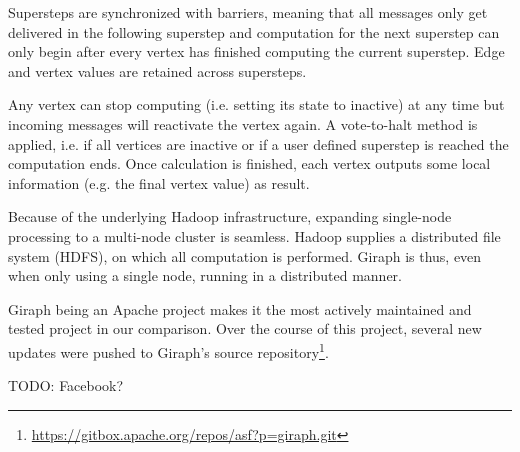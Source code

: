 Supersteps are synchronized with barriers, meaning that all messages only get delivered in the following superstep and computation for the next superstep can only begin after every vertex has finished computing the current superstep.
Edge and vertex values are retained across supersteps.

Any vertex can stop computing (i.e. setting its state to inactive) at any time but incoming messages will reactivate the vertex again.
A vote-to-halt method is applied, i.e. if all vertices are inactive or if a user defined superstep is reached the computation ends.
Once calculation is finished, each vertex outputs some local information (e.g. the final vertex value) as result.

Because of the underlying Hadoop infrastructure, expanding single-node processing to a multi-node cluster is seamless. Hadoop supplies a distributed file system (HDFS), on which all computation is performed. Giraph is thus, even when only using a single node, running in a distributed manner.

Giraph being an Apache project makes it the most actively maintained and tested project in our comparison. Over the course of this project, several new updates were pushed to Giraph's source repository\footnote{\url{https://gitbox.apache.org/repos/asf?p=giraph.git}}.

TODO: Facebook?
